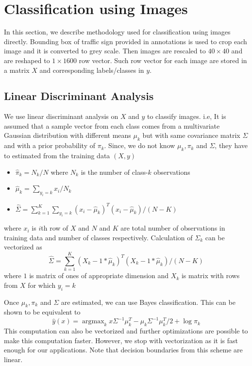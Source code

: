 \documentclass[a4paper]{article}
\newcommand{\argmax}{\operatorname{argmax}}
\begin{document}

\section{Classification using Images}
In this section, we describe methodology used for classification using images directly. Bounding box of traffic sign provided in annotations is used to crop each image and it is converted to grey scale. Then images are rescaled to $40\times 40$ and are reshaped to $1 \times 1600$ row vector. Such row vector for each image are stored in a matrix $X$ and corresponding labels/classes in $y$.

\subsection{Linear Discriminant Analysis \cite{textbook}} \label{sec:LDA}
We use linear discriminant analysis on $X$ and $y$ to classify images. i.e, It is assumed that a sample vector from each class comes from a multivariate Gaussian distribution with different means $\mu_k$ but with same covariance matrix $\Sigma$ and with a prior probability of $\pi_k$. Since, we do not know $\mu_k,\pi_k$ and $\Sigma$, they have to estimated from the training data $(X,y)$
\begin{itemize}
\item $\hat{\pi}_k = N_k/N$ where $N_k$ is the number of class-$k$ observations
\item $\hat{\mu}_k = \sum_{y_i = k}{x_i/N_k}$
\item $\hat{\Sigma} = \sum_{k = 1}^{K}\sum_{y_i = k} (x_i-\hat{\mu}_k)^T(x_i-\hat{\mu}_k)/(N-K) $
\end{itemize}
where $x_i$ is $i$th row of $X$ and $N$ and  $K$ are total number of observations in training data and number of classes respectively. Calculation of $\Sigma_k$ can be vectorized as 
\[\hat{\Sigma} = \sum_{k = 1}^{K} (X_k-1*\hat{\mu}_k)^T(X_k-1*\hat{\mu}_k)/(N-K)\] 
where $1$ is matrix of ones of appropriate dimension and $X_k$ is matrix with rows from $X$ for which $y_i = k$ 

Once $\mu_k,\pi_k$ and $\Sigma$ are estimated, we can use Bayes classification. This can be shown to be equivalent to
\[
\hat{y}(x) = \argmax_k x\Sigma^{-1}\mu_k^T - \mu_k\Sigma^{-1}\mu_k^T/2 + \log{\pi_k}
\]
This computation can also be vectorized and further optimizations are possible to make this computation faster. However, we stop with vectorization as it is fast enough for our applications. Note that decision boundaries from this scheme are linear.
\end{document}

